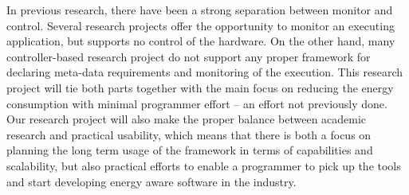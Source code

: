 \documentclass{article}
\begin{document}
In previous research, there have been a strong separation between monitor and control.
Several research projects offer the opportunity to monitor an executing application, but supports no control of the hardware.
On the other hand, many controller-based research project do not support any proper framework for declaring meta-data requirements and monitoring of the execution.
This research project will tie both parts together with the main focus on reducing the energy consumption with minimal programmer effort -- an effort not previously done.
Our research project will also make the proper balance between academic research and practical usability,
which means that there is both a focus on planning the long term usage of the framework in terms of capabilities and scalability, but also practical efforts to enable a programmer to pick up the tools and start developing energy aware software in the industry.\smallskip
\end{document}
